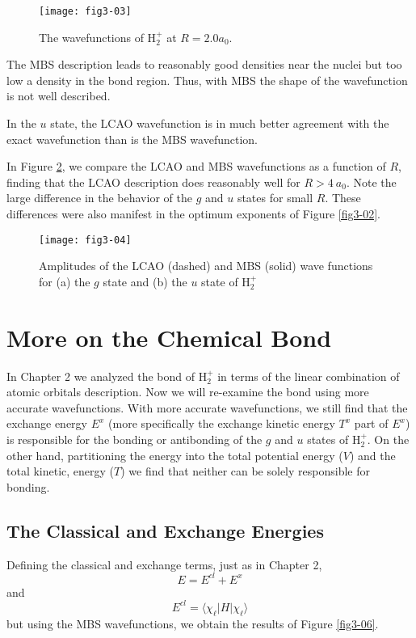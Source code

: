 \begin{figure}
\texttt{[image: fig3-03]} 
\caption{The wavefunctions of H$^+_2$ at $R = 2.0a_0$.}
\label{fig3-04}
\end{figure}

\noindent
The MBS description leads to reasonably good densities near the nuclei
but too low a density in the bond region. Thus, with MBS the shape of
the wavefunction is not well described.

In the $u$ state, the LCAO
wavefunction is in much better agreement with the exact wavefunction
than is the MBS wavefunction. 

In Figure \ref{fig3-05}, we compare the LCAO and MBS wavefunctions as
a function of $R$, finding that the LCAO description does reasonably
well for $R > 4\ a_0$.  Note the large difference in the behavior of the
$g$ and $u$ states for small $R$.  These differences were also
manifest in the optimum exponents of Figure \ref{fig3-02}.

\begin{figure}
\texttt{[image: fig3-04]}
\caption{Amplitudes of the LCAO (dashed) and MBS (solid) wave
functions for (a) the $g$ state and (b) the $u$ state of H$^+_2$}
\label{fig3-05}
\end{figure}

\section{More on the Chemical Bond}

In Chapter 2 we analyzed the bond of H$^+_2$ in terms of the linear
combination of atomic orbitals description.  Now we will re-examine
the bond using more accurate wavefunctions.  With more accurate
wavefunctions, we still find that the exchange energy $E^x$ (more
specifically the exchange kinetic energy $T^x$ part of $E^x$) is
responsible for the bonding or antibonding of the $g$ and $u$ states
of H$^+_2$.  On the other hand, partitioning the energy into the total
potential energy ($V$) and the total kinetic, energy ($T$) we find
that neither can be solely responsible for bonding.

\subsection{The Classical and Exchange Energies}

Defining the classical and exchange terms, just as in Chapter 2,
\begin{equation}
E = E^{cl} + E^x
\label{chap3-eqno23}
\end{equation}
and
\begin{equation}
E^{cl} = \langle \chi_\ell \vert H \vert \chi_\ell \rangle
\end{equation}
but using the MBS wavefunctions, we obtain the results 
of Figure \ref{fig3-06}.


